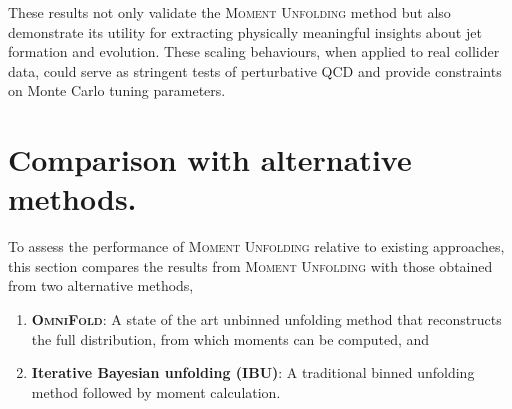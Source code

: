             These results not only validate the \textsc{Moment Unfolding} method but also demonstrate its utility for extracting physically meaningful insights about jet formation and evolution.
            These scaling behaviours, when applied to real collider data, could serve as stringent tests of perturbative QCD and provide constraints on Monte Carlo tuning parameters.
            
\section{Comparison with alternative methods.}
    To assess the performance of \textsc{Moment Unfolding} relative to existing approaches, this section compares the results from \textsc{Moment Unfolding} with those obtained from two alternative methods,
    \begin{enumerate}
        \item \textbf{\textsc{OmniFold}}: A state of the art unbinned unfolding method that reconstructs the full distribution, from which moments can be computed, and 
        \item \textbf{Iterative Bayesian unfolding (IBU)}: A traditional binned unfolding method followed by moment calculation.
    \end{enumerate}
